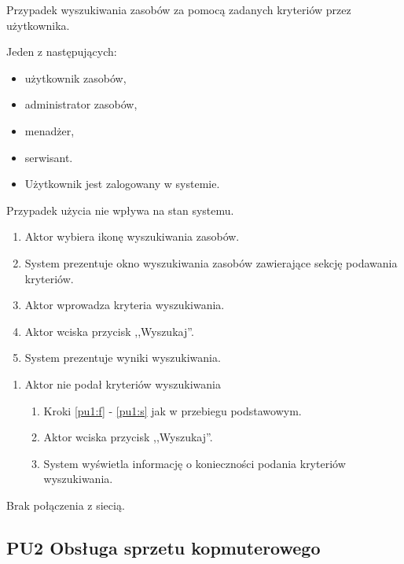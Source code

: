 Przypadek wyszukiwania zasobów za pomocą zadanych kryteriów przez użytkownika.

Jeden z następujących:
\begin{itemize}
\item użytkownik zasobów,
\item administrator zasobów,
\item menadżer,
\item serwisant.
\end{itemize}

\begin{itemize}
\item Użytkownik jest zalogowany w systemie.
\end{itemize}

Przypadek użycia nie wpływa na stan systemu.

\begin{enumerate}
\item \label{pu1:f} Aktor wybiera ikonę wyszukiwania zasobów.
\item \label{pu1:s}System prezentuje okno wyszukiwania zasobów zawierające sekcję podawania kryteriów.
\item Aktor wprowadza kryteria wyszukiwania.
\item Aktor wciska przycisk ,,Wyszukaj''.
\item System prezentuje wyniki wyszukiwania.
\end{enumerate}

\begin{enumerate}
\item Aktor nie podał kryteriów wyszukiwania
	\begin{enumerate}[label*=\arabic*.]
	\item Kroki \ref{pu1:f} - \ref{pu1:s} jak w przebiegu podstawowym.
	\item Aktor wciska przycisk ,,Wyszukaj''.
	\item System wyświetla informację o konieczności podania kryteriów wyszukiwania.
	\end{enumerate}
\end{enumerate}

Brak połączenia z siecią.



\subsection{PU2 Obsługa sprzetu kopmuterowego} \label{pu2}

